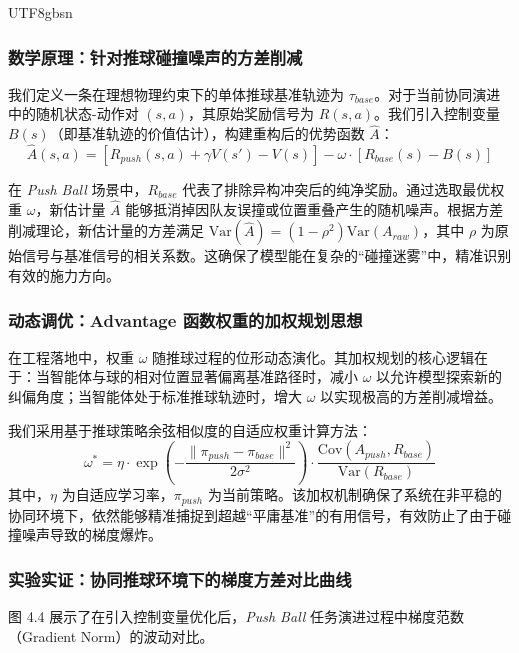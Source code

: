 \documentclass[11pt,a4paper]{article}
\begin{document}
\begin{CJK*}{UTF8}{gbsn}
\subsubsection{数学原理：针对推球碰撞噪声的方差削减}
我们定义一条在理想物理约束下的单体推球基准轨迹为 $\tau_{base}$。对于当前协同演进中的随机状态-动作对 $(s, a)$，其原始奖励信号为 $R(s, a)$。我们引入控制变量 $B(s)$（即基准轨迹的价值估计），构建重构后的优势函数 $\hat{A}$：
\begin{equation}
\hat{A}(s, a) = [R_{push}(s, a) + \gamma V(s') - V(s)] - \omega \cdot [R_{base}(s) - B(s)]
\end{equation}



在 \textit{Push Ball} 场景中，$R_{base}$ 代表了排除异构冲突后的纯净奖励。通过选取最优权重 $\omega$，新估计量 $\hat{A}$ 能够抵消掉因队友误撞或位置重叠产生的随机噪声。根据方差削减理论，新估计量的方差满足 $\text{Var}(\hat{A}) = (1 - \rho^2) \text{Var}(A_{raw})$，其中 $\rho$ 为原始信号与基准信号的相关系数。这确保了模型能在复杂的“碰撞迷雾”中，精准识别有效的施力方向。

\subsubsection{动态调优：Advantage 函数权重的加权规划思想}
在工程落地中，权重 $\omega$ 随推球过程的位形动态演化。其加权规划的核心逻辑在于：当智能体与球的相对位置显著偏离基准路径时，减小 $\omega$ 以允许模型探索新的纠偏角度；当智能体处于标准推球轨迹时，增大 $\omega$ 以实现极高的方差削减增益。

我们采用基于推球策略余弦相似度的自适应权重计算方法：
\begin{equation}
\omega^* = \eta \cdot \exp\left( -\frac{\| \pi_{push} - \pi_{base} \|^2}{2\sigma^2} \right) \cdot \frac{\text{Cov}(A_{push}, R_{base})}{\text{Var}(R_{base})}
\end{equation}
其中，$\eta$ 为自适应学习率，$\pi_{push}$ 为当前策略。该加权机制确保了系统在非平稳的协同环境下，依然能够精准捕捉到超越“平庸基准”的有用信号，有效防止了由于碰撞噪声导致的梯度爆炸。



\subsubsection{实验实证：协同推球环境下的梯度方差对比曲线}
图 4.4 展示了在引入控制变量优化后，\textit{Push Ball} 任务演进过程中梯度范数（Gradient Norm）的波动对比。

\begin{figure}[H]
\centering
{}
\end{figure}
\end{CJK*}
\end{document}
